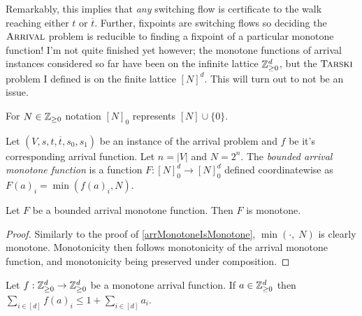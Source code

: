   Remarkably, this implies that \emph{any} switching flow is certificate to the walk reaching either $t$
  or $\overline{t}$. Further, fixpoints are switching flows so deciding the $\textsc{Arrival}$ problem is reducible
  to finding a fixpoint of a particular monotone function! I'm not quite finished yet however;
  the monotone functions of arrival instances considered so far have been on the infinite lattice $\mathbb{Z}_{\geq 0}^d$, but
  the $\textsc{Tarski}$ problem I defined is on the finite lattice $[N]^d$. This will turn out to not be an issue.
  \begin{notation}
    For $N \in \mathbb{Z}_{\geq 0}$ notation $[N]_0$ represents $[N] \cup \{0\}$.
  \end{notation}
  \newcommand{\no}{[N]_0}
  \begin{definition}
    Let $(V, s, t, \overline{t}, s_0, s_1)$ be an instance of the arrival problem and $f$
    be it's corresponding arrival function. Let $n = |V|$ and $N = 2^n$. The \emph{bounded arrival monotone function}
    is a function $F : \no^d \to \no^d$ defined coordinatewise as $F(a)_i = \min(f(a)_i, N)$. 
  \end{definition}
  \begin{lemma}
    Let $F$ be a bounded arrival monotone function. Then $F$ is monotone.
  \end{lemma}
  \begin{proof}
    Similarly to the proof of \cref{arrMonotoneIsMonotone}, $\min(\cdot, \; N)$ is clearly monotone.
    Monotonicity then follows monotonicity of the arrival monotone function, and monotonicity
    being preserved under composition.
  \end{proof}
  \begin{lemma}\label{upOne}
    Let $f : \mathbb{Z}_{\geq 0}^d \to \mathbb{Z}_{\geq 0}^d$ be a monotone arrival function. If $a \in \mathbb{Z}_{\geq 0}^d$ then
    $\sum_{i \in [d]} f(a)_i \leq 1 + \sum_{i \in [d]} a_i$.
  \end{lemma}
